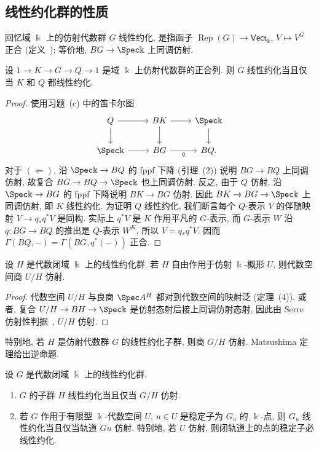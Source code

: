 \subsection{线性约化群的性质}\label{src:7.5.3-subsection}
回忆域 $\Bbbk$ 上的仿射代数群 $G$ 线性约化, 是指函子 $\operatorname{Rep}(G)\to\mathsf{Vect}_{\Bbbk}$, $V\mapsto V^G$ 正合 (定义~); 等价地, $BG\to\Spec\Bbbk$ 上同调仿射.
\begin{proposition}\label{src:7.5.21}
设 $1\to K\to G\to Q\to1$ 是域 $\Bbbk$ 上仿射代数群的正合列. 则 $G$ 线性约化当且仅当 $K$ 和 $Q$ 都线性约化.
\end{proposition}
\begin{proof}
使用习题~(c) 中的笛卡尔图
\begin{align*}
\begin{tikzcd}[ampersand replacement=\&]
Q\arrow[r]\arrow[d]\&BK\arrow[r]\arrow[d]\&\Spec\Bbbk\arrow[d]\\
\Spec\Bbbk\arrow[r]\&BG\arrow[r,"{q}"']\&BQ.
\end{tikzcd}
\end{align*}
对于 $(\Leftarrow)$, 沿 $\Spec\Bbbk\to BQ$ 的 fppf 下降 (引理~(2)) 说明 $BG\to BQ$ 上同调仿射, 故复合 $BG\to BQ\to\Spec\Bbbk$ 也上同调仿射. 反之, 由于 $Q$ 仿射, 沿 $\Spec\Bbbk\to BG$ 的 fppf 下降说明 $BK\to BG$ 仿射. 因此 $BK\to BG\to\Spec\Bbbk$ 上同调仿射, 即 $K$ 线性约化. 为证明 $Q$ 线性约化, 我们断言每个 $Q$-表示 $V$ 的伴随映射 $V\to q_*q^*V$ 是同构. 实际上 $q^*V$ 是 $K$ 作用平凡的 $G$-表示, 而 $G$-表示 $W$ 沿 $q:BG\to BQ$ 的推出是 $Q$-表示 $W^K$, 所以 $V=q_*q^*V$. 因而 $\Gamma(BQ,-)=\Gamma(BG,q^*(-))$ 正合.
\end{proof}
\begin{proposition}\label{src:7.5.22}
设 $H$ 是代数闭域 $\Bbbk$ 上的线性约化群. 若 $H$ 自由作用于仿射 $\Bbbk$-概形 $U$, 则代数空间商 $U/H$ 仿射.
\end{proposition}
\begin{proof}
代数空间 $U/H$ 与良商 $\Spec A^H$ 都对到代数空间的映射泛 (定理~(4)). 或者, 复合 $U/H\to BH\to\Spec\Bbbk$ 是仿射态射后接上同调仿射态射, 因此由 Serre 仿射性判据~, $U/H$ 仿射.
\end{proof}
特别地, 若 $H$ 是仿射代数群 $G$ 的线性约化子群, 则商 $G/H$ 仿射. Matsushima 定理给出逆命题.
\begin{proposition}[Matsushima 定理]\label{src:7.5.23}
设 $G$ 是代数闭域 $\Bbbk$ 上的线性约化群.
\begin{enumerate}[(1)]
\item $G$ 的子群 $H$ 线性约化当且仅当 $G/H$ 仿射.
\item 若 $G$ 作用于有限型 $\Bbbk$-代数空间 $U$, $u\in U$ 是稳定子为 $G_u$ 的 $\Bbbk$-点, 则 $G_u$ 线性约化当且仅当轨道 $Gu$ 仿射. 特别地, 若 $U$ 仿射, 则闭轨道上的点的稳定子必线性约化.
\end{enumerate}
\end{proposition}
